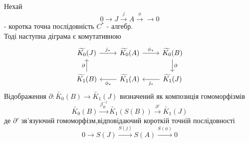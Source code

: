 \begin{theorem}
    Нехай
    \begin{equation*}
        0 \to J \xrightarrow{j} A \xrightarrow{\phi} \to 0
    \end{equation*}
    - коротка точна послідовність $C^*$ - алгебр. \\
    Тоді наступна діграма є комутативною
    \begin{equation*}
        \begin{tikzcd}
            \widetilde{K_0}(J) \arrow[r, "j_*"]      & \widetilde{K_0}(A) \arrow[r, "\phi_*"] & \widetilde{K_0}(B) \arrow[d, "\partial"] \\
            \widetilde{K_1}(B) \arrow[u, "\partial"] & \widetilde{K_1}(A) \arrow[l, "\phi_*"] & \widetilde{K_1}(J) \arrow[l, "j_*"]
        \end{tikzcd}
    \end{equation*}
    Відображення $\partial: \widetilde{K_0}(B) \to \widetilde{K_1}(J)$ визначений
    як композиція гомоморфізмів
    \begin{equation*}
        \widetilde{K_0}(B) \xrightarrow{\beta_B^{-1}} \widetilde{K_1}(S(B)) \xrightarrow{\partial'} \widetilde{K_1}(J)
    \end{equation*}
    де $\partial'$ зв'язуючий гомоморфізм,відповідаючий короткій точній послідовності
    \begin{equation*}
        0 \to S(J) \xrightarrow{S(j)} S(A) \xrightarrow{S(\phi)} 0
    \end{equation*}
\end{theorem}


